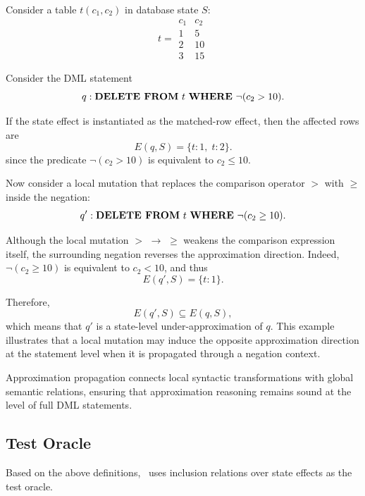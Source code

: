 \begin{example}
	Consider a table $t(c_1, c_2)$ in database state $S$:
	\[
	t =
	\begin{array}{c|c}
		c_1 & c_2 \\
		\hline
		1 & 5 \\
		2 & 10 \\
		3 & 15
	\end{array}
	\]
	
	Consider the DML statement
	\[
	q : \text{\textbf{DELETE FROM} } t
	\text{ \textbf{WHERE} } \neg (c_2 > 10).
	\]
	
	If the state effect is instantiated as the matched-row effect, then the affected rows are
	\[
	E(q,S)=\{t\!:\!1,\; t\!:\!2\}.
	\]
	since the predicate $\neg(c_2 > 10)$ is equivalent to $c_2 \le 10$.
	
	Now consider a local mutation that replaces the comparison operator $>$ with $\ge$ inside the negation:
	\[
	q' : \text{\textbf{DELETE FROM} } t
	\text{ \textbf{WHERE} } \neg (c_2 \ge 10).
	\]
	
	Although the local mutation $>$ $\rightarrow$ $\ge$ weakens the comparison expression itself, 
	the surrounding negation reverses the approximation direction. 
	Indeed, $\neg(c_2 \ge 10)$ is equivalent to $c_2 < 10$, and thus
	\[
	E(q',S)=\{t\!:\!1\}.
	\]
	
	Therefore,
	\[
	E(q',S) \subseteq E(q,S),
	\]
	which means that $q'$ is a state-level under-approximation of $q$. 
	This example illustrates that a local mutation may induce the opposite approximation direction at the statement level when it is propagated through a negation context.
\end{example}

Approximation propagation connects local syntactic transformations with global semantic relations, ensuring that approximation reasoning remains sound at the level of full DML statements.

\subsection{Test Oracle}

Based on the above definitions, \model\ uses inclusion relations over state effects as the test oracle.

